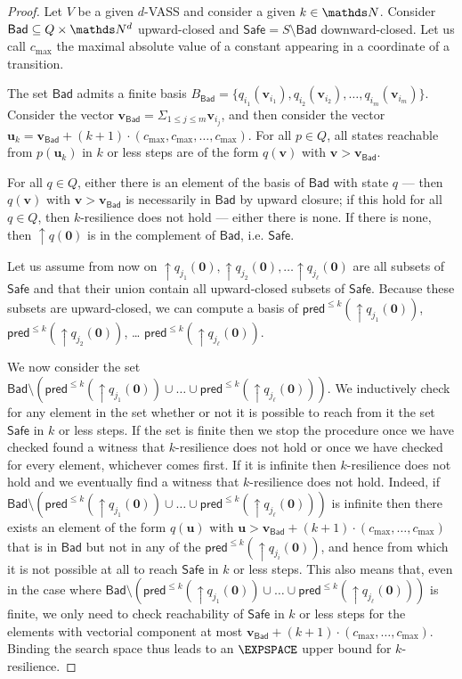 \documentclass[runningheads]{llncs}
\newcommand{\pred}{\textsf{pred}}
\newcommand{\Bad}{\textsf{Bad}}
\newcommand{\Safe}{\textsf{Safe}}
\begin{document}
\begin{proof}
Let $V$ be a given $d$-VASS and consider a given $k \in \N$.
Consider $\Bad \subseteq Q \times \N^d$ upward-closed and 
$\Safe = S \setminus \Bad$
 downward-closed.
Let us call $c_{\max}$ the maximal absolute value of a constant appearing in a coordinate of a transition.

The set $\Bad$ admits a finite basis 
$B_\Bad = \{ q_{i_1}(\textbf{v}_{i_1}), q_{i_2}(\textbf{v}_{i_2}), \ldots,
q_{i_m}(\textbf{v}_{i_m}) \}$.
Consider the vector $\textbf{v}_{\Bad} = \Sigma_{1 \leq j \leq m} \textbf{v}_{i_j}$,
and then consider the vector
$\textbf{u}_k = \textbf{v}_{\Bad} + (k+1) \cdot (c_{\max}, c_{\max}, \ldots, c_{\max})$.
For all $p \in Q$, all states reachable from $p(\textbf{u}_k)$ in $k$ or less steps are 
of the form $q(\textbf{v})$ with $ \textbf{v} > \textbf{v}_{\Bad}$.

For all $q \in Q$, either there is an element of the basis of $\Bad$ with state $q$ \----
then $q(\textbf{v})$ with $\textbf{v} > \textbf{v}_{\Bad}$ is necessarily in $\Bad$ by upward closure; if this hold for all $q \in Q$, then $k$-resilience does not hold \---- either there is none. If there is none, then 
$\uparrow q(\textbf{0})$
 is in the complement of $\Bad$, i.e. $\Safe$.

Let us assume from now on 
 $\uparrow q_{j_1}(\textbf{0}), \uparrow q_{j_2}(\textbf{0}), \ldots \uparrow q_{j_\ell}(\textbf{0})$ are
all subsets of $\Safe$ and that their union contain all upward-closed subsets of $\Safe$.
Because these subsets are upward-closed, we can compute a basis of
$\pred^{\leq k}(\uparrow q_{j_1}(\textbf{0}))$, $\pred^{\leq k}(\uparrow q_{j_2}(\textbf{0}))$, \ldots
$\pred^{\leq k}(\uparrow q_{j_\ell}(\textbf{0}))$.


We now consider the set 
$\Bad \setminus (\pred^{\leq k}(\uparrow q_{j_1}(\textbf{0})) \cup \ldots \cup \pred^{\leq k}(\uparrow q_{j_\ell}(\textbf{0})) )$.
We inductively check for any element in the set whether or not it is possible to reach from it the set $\Safe$ in $k$ or less steps.
If the set is finite then we stop the procedure once we have checked found a witness that $k$-resilience does not hold or once we have checked for every element, whichever comes first.
If it is infinite then
$k$-resilience does not hold 
and we eventually find a witness that $k$-resilience does not hold.
Indeed, 
if
$\Bad \setminus (\pred^{\leq k}(\uparrow q_{j_1}(\textbf{0})) \cup \ldots \cup \pred^{\leq k}(\uparrow q_{j_\ell}(\textbf{0})) )$
is
infinite
then
there exists an element of the form $q(\textbf{u} )$
with $\textbf{u} > \textbf{v}_{\Bad} + (k+1) \cdot (c_{\max}, \ldots, c_{\max})$ 
that is in $\Bad$ but not in any of the $\pred^{\leq k}(\uparrow q_{j_i}(\textbf{0}))$,
and hence from which it is not possible at all to reach
$\Safe$ in $k$ or less steps. This also means that, even in the case where $\Bad \setminus (\pred^{\leq k}(\uparrow q_{j_1}(\textbf{0})) \cup \ldots \cup \pred^{\leq k}(\uparrow q_{j_\ell}(\textbf{0})) )$ is finite, we only need to check reachability of $\Safe$ in $k$ or less steps for the elements with vectorial component at most
$ \textbf{v}_{\Bad} + (k+1) \cdot (c_{\max}, \ldots, c_{\max})$. Binding the search space
thus leads to an $\EXPSPACE$ upper bound for {\sc $k$-resilience}.



\end{proof}
\end{document}

